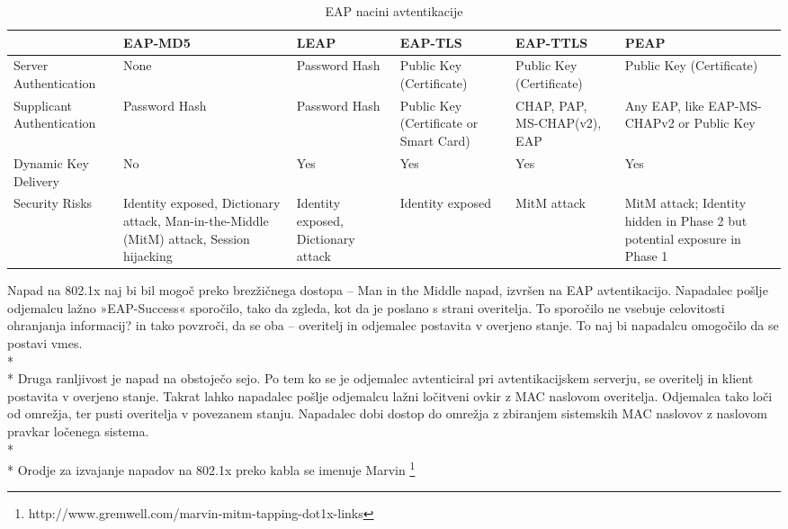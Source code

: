 \documentclass[12pt]{article}
\begin{document}
\begin{table}[h]\footnotesize
    \caption{EAP nacini avtentikacije}
    \label{eaptypes}
    \begin{tabular}{ | p{3cm} | p{4cm} | p{2cm} | p{2cm} | p{2cm} | p{3cm} | }
        \hline
         & EAP-MD5 & LEAP & EAP-TLS & EAP-TTLS & PEAP \\
        \hline
        Server Authentication & None & Password Hash & Public Key (Certificate) & Public Key (Certificate) & Public Key (Certificate) \\
        \hline
        Supplicant Authentication & Password Hash & Password Hash & Public Key (Certificate or Smart Card) & CHAP, PAP, MS-CHAP(v2), EAP & Any EAP, like EAP-MS-CHAPv2 or Public Key \\
        \hline
        Dynamic Key Delivery & No & Yes & Yes & Yes & Yes \\
        \hline
        Security Risks & Identity exposed, Dictionary attack, Man-in-the-Middle (MitM) attack, Session hijacking & Identity exposed, Dictionary attack & Identity exposed & MitM attack & MitM attack; Identity hidden in Phase 2 but potential exposure in Phase 1 \\
        \hline
    \end{tabular}
\end{table}


Napad na 802.1x naj bi bil mogoč preko brezžičnega dostopa – Man in the Middle napad, izvršen na EAP avtentikacijo. Napadalec pošlje odjemalcu lažno »EAP-Success« sporočilo, tako da zgleda, kot da je poslano s strani overitelja. To sporočilo ne vsebuje celovitosti ohranjanja informacij? in tako povzroči, da se oba – overitelj in odjemalec postavita v overjeno stanje. To naj bi napadalcu omogočilo da se postavi vmes.
\\*
\\* \indent
Druga ranljivost je napad na obstoječo sejo. Po tem ko se je odjemalec avtenticiral pri avtentikacijskem serverju, se overitelj in klient postavita v overjeno stanje. Takrat lahko napadalec pošlje odjemalcu lažni ločitveni ovkir z MAC naslovom overitelja. Odjemalca tako loči od omrežja, ter pusti overitelja v povezanem stanju. Napadalec dobi dostop do omrežja z zbiranjem sistemskih MAC naslovov z naslovom pravkar ločenega sistema.
\\*
\\* \indent
Orodje za izvajanje napadov na 802.1x preko kabla se imenuje Marvin \footnote{http://www.gremwell.com/marvin-mitm-tapping-dot1x-links}
\end{document}
